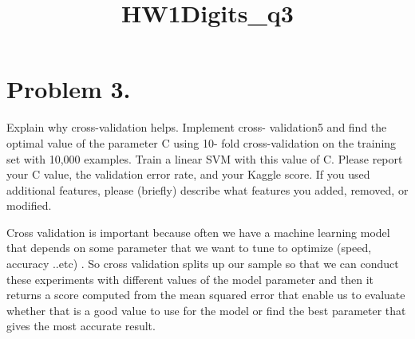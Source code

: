 \documentclass{article}
\title{HW1Digits\_q3}
\begin{document}
    
    
    \maketitle
    
    

    
    \section{\textbf{Problem 3.}}\label{problem-3.}

Explain why cross-validation helps. Implement cross- validation5 and
find the optimal value of the parameter C using 10- fold
cross-validation on the training set with 10,000 examples. Train a
linear SVM with this value of C. Please report your C value, the
validation error rate, and your Kaggle score. If you used additional
features, please (briefly) describe what features you added, removed, or
modified.

Cross validation is important because often we have a machine learning
model that depends on some parameter that we want to tune to optimize
(speed, accuracy ..etc) . So cross validation splits up our sample so
that we can conduct these experiments with different values of the model
parameter and then it returns a score computed from the mean squared
error that enable us to evaluate whether that is a good value to use for
the model or find the best parameter that gives the most accurate
result.
\end{document}
